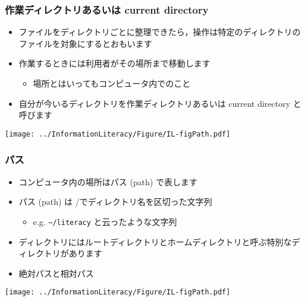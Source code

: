 \begin{frame}
\frametitle{作業ディレクトリあるいは current directory}
  \begin{itemize}
\item ファイルをディレクトリごとに整理できたら，操作は特定のディレクトリのファイルを対象にするとおもいます
\item 作業するときには利用者がその場所まで移動します
    \begin{itemize}
\item 場所とはいってもコンピュータ内でのこと
    \end{itemize}
\item 自分が今いるディレクトリを作業ディレクトリあるいは current directory と呼びます
  \end{itemize}
  \begin{center}
\texttt{[image: ../InformationLiteracy/Figure/IL-figPath.pdf]}
  \end{center}
\end{frame}
\begin{frame}[containsverbatim]
\frametitle{パス}
  \begin{itemize}
\item コンピュータ内の場所はパス (path) で表します
\item パス (path) は \slash でディレクトリ名を区切った文字列
    \begin{itemize}
\item e.g. \verb|~/literacy| と云ったような文字列
    \end{itemize}
\item ディレクトリにはルートディレクトリとホームディレクトリと呼ぶ特別なディレクトリがあります
\item 絶対パスと相対パス
  \end{itemize}
  \begin{center}
\texttt{[image: ../InformationLiteracy/Figure/IL-figPath.pdf]}
  \end{center}
\end{frame}
